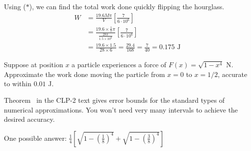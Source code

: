 \begin{solution}
 Using ($*$), we can find the total work done quickly flipping the hourglass.
 \begin{align*}
 W&=\frac{19.6M\pi}{V}\left[\frac{7}{6\cdot 10^6} \right]\\
 &=\frac{19.6 \times \frac{1}{7} \pi}{\frac{28\pi}{1.5\times 10^6}}\left[\frac{7}{6\cdot 10^6} \right]
\\&=\frac{19.6 \times 1.5 }{28 \times 6} = \frac{29.4}{168} =\frac{7}{40}= 0.175 \text{ J}
 \end{align*}
\end{solution}
\begin{Mquestion}
Suppose  at position $x$ a particle experiences a force of $F(x) = \sqrt{1-x^4}$ N. Approximate the work done moving the particle from $x=0$ to $x=1/2$, accurate to within $0.01$ J.
\end{Mquestion}
\begin{hint}
Theorem~ in the CLP-2 text gives error bounds for the standard types of numerical approximations. You won't need very many intervals to achieve the desired accuracy.
\end{hint}
\begin{answer}
One possible answer: $\displaystyle \frac{1}{4}\left[\sqrt{1-\left(\frac18\right)^4} +
 \sqrt{1-\left(\frac38\right)^4}\right]$
\end{answer}
